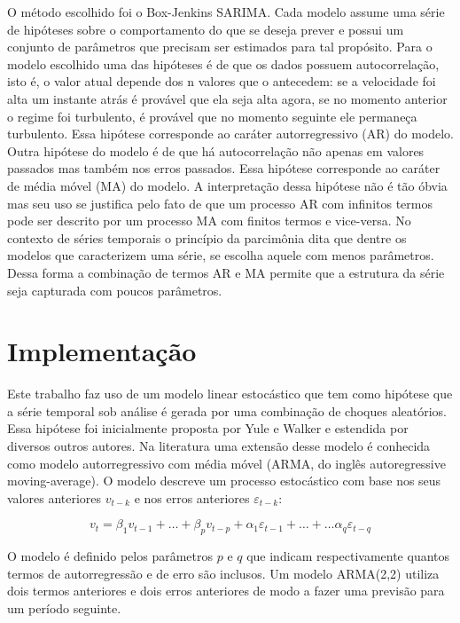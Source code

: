 \documentclass[
	12pt,				%
	openright,			%
	oneside,			%
	a4paper,			%
	english,			%
	french,				%
	spanish,			%
	brazil				%
	]{abntex2}
\begin{document}
O método escolhido foi o Box-Jenkins SARIMA.
Cada modelo assume uma série de hipóteses sobre o comportamento do que se deseja prever e possui um conjunto de parâmetros que precisam ser estimados para tal propósito. Para o modelo escolhido uma das hipóteses é de que os dados possuem autocorrelação, isto é, o valor atual depende dos n valores que o antecedem: se a velocidade foi alta um instante atrás é provável que ela seja alta agora, se no momento anterior o regime foi turbulento, é provável que no momento seguinte ele permaneça turbulento. Essa hipótese corresponde ao caráter autorregressivo (AR) do modelo. Outra hipótese do modelo é de que há autocorrelação não apenas em valores passados mas também nos erros passados. Essa hipótese corresponde ao caráter de média móvel (MA) do modelo. A interpretação dessa hipótese não é tão óbvia mas seu uso se justifica pelo fato de que um processo AR com infinitos termos pode ser descrito por um processo MA com finitos termos e vice-versa. No contexto de séries temporais o princípio da parcimônia dita que dentre os modelos que  caracterizem uma série, se escolha aquele com menos parâmetros. Dessa forma a combinação de termos AR e MA permite que a estrutura da série seja capturada com poucos parâmetros.


\part{Implementação}

Este trabalho faz uso de um modelo linear estocástico que tem como hipótese que a série temporal sob análise é gerada por uma combinação de choques aleatórios. Essa hipótese foi inicialmente proposta por Yule e Walker e estendida por diversos outros autores.
Na literatura uma extensão desse modelo é conhecida como modelo autorregressivo com média móvel (ARMA, do inglês autoregressive moving-average).
O modelo descreve um processo estocástico com base nos seus valores anteriores $v_{t-k}$ e nos erros anteriores $\varepsilon_{t-k}$:

\begin{equation}
v_t = \beta_1 v_{t-1} + \dots + \beta_p v_{t-p} + \alpha_1\varepsilon_{t-1} + \dots + \dots \alpha_q\varepsilon_{t-q} 
\end{equation}

O modelo é definido pelos parâmetros $p$ e $q$ que indicam respectivamente quantos termos de autorregressão e de erro são inclusos. Um modelo ARMA(2,2) utiliza dois termos anteriores e dois erros anteriores de modo a fazer uma previsão para um período seguinte. 
\end{document}
